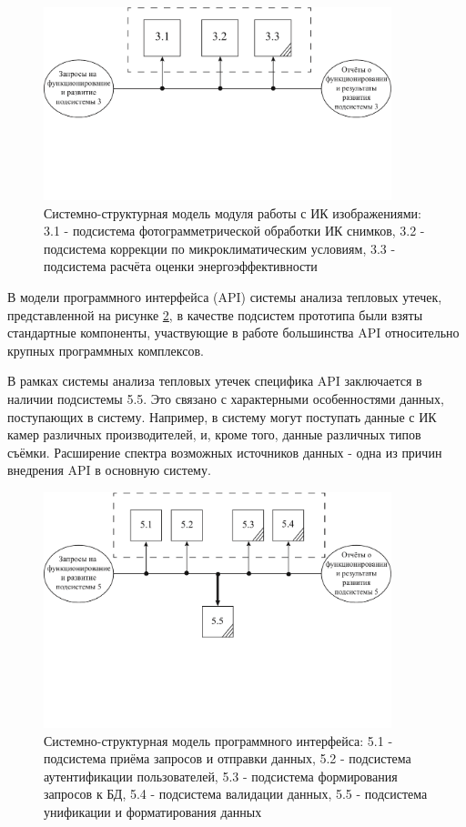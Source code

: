 	\begin{figure}[t!]
      \centering
      \includegraphics[width=0.9\textwidth]{images/ssm/3}
      \caption{Системно-структурная модель модуля работы с ИК изображениями: 3.1 - подсистема фотограмметрической обработки ИК снимков, 3.2 - подсистема коррекции по микроклиматическим условиям, 3.3 - подсистема расчёта оценки энергоэффективности}
      \label{ssm:3}
    \end{figure}

\par
	В модели программного интерфейса (API) системы анализа тепловых утечек, представленной на рисунке \ref{ssm:5}, в качестве подсистем прототипа были взяты стандартные компоненты, участвующие в работе большинства API относительно крупных программных комплексов. 
	
	В рамках системы анализа тепловых утечек специфика API заключается в наличии подсистемы 5.5. Это связано с характерными особенностями данных, поступающих в систему. Например, в систему могут поступать данные с ИК камер различных производителей, и, кроме того, данные различных типов съёмки. Расширение спектра возможных источников данных - одна из причин внедрения API в основную систему.

\pagebreak

	\begin{figure}[t!]
      \centering
      \includegraphics[width=0.9\textwidth]{images/ssm/5}
      \caption{Системно-структурная модель программного интерфейса: 5.1 - подсистема приёма запросов и отправки данных,  5.2 - подсистема аутентификации пользователей, 5.3 - подсистема формирования запросов к БД, 5.4 - подсистема валидации данных, 5.5 - подсистема унификации и форматирования данных}
      \label{ssm:5}
    \end{figure}


